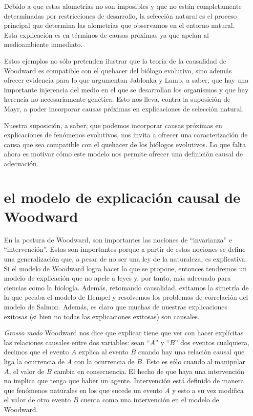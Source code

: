 Debido a que estas alometrías no son imposibles y que no están completamente determinadas por restricciones de desarrollo, la selección natural es el proceso principal que determina las alometrías que observamos en el entorno natural. Esta explicación es en términos de causas próximas ya que apelan al medioambiente inmediato.

Estos ejemplos no sólo pretenden ilustrar que la teoría de la causalidad de Woodward es compatible con el quehacer del biólogo evolutivo, sino además ofrecer evidencia para lo que argumentan Jablonka y Lamb, a saber, que hay una importante injerencia del medio en el que se desarrollan los organismos y que hay herencia no necesariamente genética.  Esto nos lleva, contra la suposición de Mayr, a poder incorporar causas próximas en explicaciones de selección natural.

Nuestra suposición, a saber, que podemos incorporar causas próximas en explicaciones de fenómenos evolutivos, nos invita a ofrecer una caracterización de causa que sea compatible con el quehacer de los biólogos evolutivos. Lo que falta ahora es motivar cómo este modelo nos permite ofrecer una definición causal de adecuación.

\section{el modelo de explicación causal de Woodward}

En la postura de Woodward, son importantes las nociones de ``invarianza'' e ``intervención''. Estas son importantes porque a partir de estas nociones se define una generalización que, a pesar de no ser una ley de la naturaleza, es explicativa. Si el modelo de Woodward logra hacer lo que se propone, entonces tendremos un modelo de explicación que no apele a leyes y, por tanto, más adecuado para ciencias como la biología. Además, retomando causalidad, evitamos la simetría de la que pecaba el modelo de Hempel y resolvemos los problemas de correlación del modelo de Salmon. Además, es claro que muchas de nuestras explicaciones exitosas (si bien no todas las explicaciones exitosas) son causales.

\textit{Grosso modo} Woodward nos dice que explicar tiene que ver con hacer explícitas las relaciones causales entre dos variables: sean ``$A$'' y ``$B$'' dos eventos cualquiera, decimos que el evento $A$ explica al evento $B$ cuando hay una relación causal que liga la ocurrencia de $A$ con la ocurrencia de $B$. Esto es sólo cuando al manipular $A$, el valor de $B$ cambia en consecuencia. El hecho de que haya una intervención no implica que tenga que haber un agente. Intervención está definido de manera que fenómenos naturales en los que sucede un evento $A$ y esto a su vez modifica el valor de otro evento $B$ cuenta como una intervención en el modelo de Woodward.

